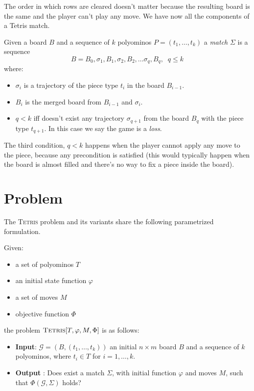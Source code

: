 The order in which rows are cleared doesn't matter because the resulting board is the same and the player can't play any move. We have now all the components of a Tetris match.

\begin{definition}  
  Given a board $B$ and a sequence of $k$ polyominos $P = (t_1,\dots,t_k)$ a \emph{match} $\Sigma$ is a sequence
  $$ B = B_0, \sigma_1, B_1, \sigma_2, B_2, \dots  \sigma_q, B_q, \; \; q \leq k$$ 
  where:
  \begin{itemize}
    \item $\sigma_i$ is a trajectory of the piece type $t_i$ in the board $B_{i-1}$.
    \item $B_{i}$ is the merged board from $B_{i-1}$ and $\sigma_i$.
    \item $q < k$ iff doesn't exist any trajectory $\sigma_{q+1}$ from the board $B_q$ with the piece type $t_{q+1}$. In this case we say the game is a \emph{loss}.
  \end{itemize}
\end{definition}

The third condition, $q < k$ happens when the player cannot apply any move to the piece, because any precondition is satisfied (this would typically happen when the board is almost filled and there's no way to fix a piece inside the board).

\section{Problem}

The \textsc{Tetris} problem and its variants share the following parametrized formulation.
\begin{definition} 
  Given: 
  \begin{itemize}
    \item a set of polyominos $T$
    \item an initial state function $\varphi$
    \item a set of moves $ M $
    \item objective function $\Phi$
  \end{itemize}
    the problem $\textsc{Tetris}[T,\varphi,M,\Phi]$ is as follows:
  
  \begin{itemize}
    \item \textbf{Input}: $\mathcal{G} = (B,(t_1,\dots,t_k))$ an initial $n\times m$ board $B$ and a sequence of $k$ polyominos, where $t_i \in T$ for $i = 1,\dots,k$.
    
    \item \textbf{Output} : Does exist a match $\Sigma$, with initial function $\varphi$ and moves $M$, such that $\Phi ( \mathcal{G}, \Sigma )$ holds? 
  \end{itemize}


\end{definition}

